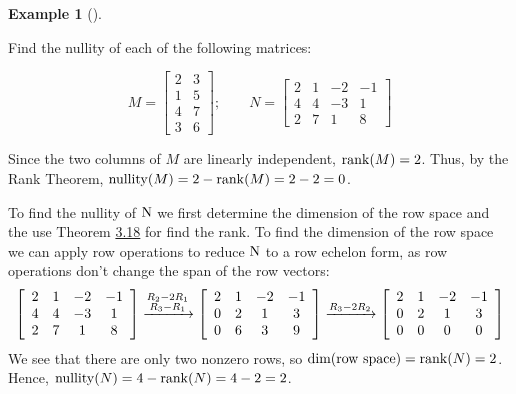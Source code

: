 \documentclass[
  a4paper,
  DIV=11,
  numbers=noendperiod,
  oneside]{scrreprt}
\theoremstyle{definition}
\newtheorem{example}{Example}[chapter]
\theoremstyle{remark}
\newenvironment{fbx}[3]{\begin{tcolorbox}[enhanced, breakable,%
attach boxed title to top*={xshift=1.4pt},
boxed title style={boxrule=0.0mm, fuzzy shadow={1pt}{-1pt}{0mm}{0.1mm}{gray}, arc=.3em, rounded corners=east, sharp corners=west}, colframe=#1-color2, colbacktitle=#1-color1, colback = white, coltitle=black,  titlerule=0mm, toprule=0pt, bottomrule=.7pt, leftrule=.3em, rightrule=0pt, outer arc=.3em,  arc=0pt,	 sharp corners = east, left=.5em, bottomtitle=1mm, toptitle=1mm,title=\textbf{#2}\hspace{0.5em}{#3}]}
{\end{tcolorbox}}
\begin{document}
\begin{example}[]\protect\hypertarget{exm-}{}\label{exm-}

Find the nullity of each of the following matrices:

\[M = \left[\begin{array}{cc} 2 & 3 \\ 1 & 5 \\ 4 & 7 \\ 3 & 6 \end{array}\right]; \qquad N = \left[\begin{array}{cccc} 2 & 1 & -2 & -1 \\ 4 & 4 & -3 & 1 \\ 2 & 7 & 1 & 8 \end{array}\right]\]

\begin{fbx}{Solution}{Solution}{}
\label{}
Since the two columns of \(M\) are linearly independent,
\({\rm rank}(M)=2\). Thus, by the Rank Theorem,
\({\rm nullity}(M) = 2 - {\rm rank}(M) = 2 - 2 = 0\).

To find the nullity of \({\rm N}\) we first determine the dimension of
the row space and the use Theorem \hyperref[rowcolumnspace]{3.18} for
find the rank. To find the dimension of the row space we can apply row
operations to reduce \({\rm N}\) to a row echelon form, as row
operations don't change the span of the row vectors:
\[\left[\begin{array}{cccc} 2 & 1 & -2 & -1 \\ 4 & 4 & -3 & 1 \\ 2 & 7 & 1 & 8 \end{array}\right] \xrightarrow{\begin{subarray}{c} R_2 - 2R_1 \\ R_3 - R_1 \end{subarray}} \left[\begin{array}{cccc} 2 & 1 & -2 & -1 \\ 0 & 2 & 1 & 3 \\ 0 & 6 & 3 & 9 \end{array}\right] \xrightarrow{R_3 - 2R_2} \left[\begin{array}{cccc} 2 & 1 & -2 & -1 \\ 0 & 2 & 1 & 3 \\ 0 & 0 & 0 & 0 \end{array}\right]\]
We see that there are only two nonzero rows, so
\({\rm dim(row\ space)} = {\rm rank}(N)=2\). Hence,
\({\rm nullity}(N) = 4 - {\rm rank}(N) = 4 - 2 = 2\).

\end{fbx}

\end{example}
\end{document}
